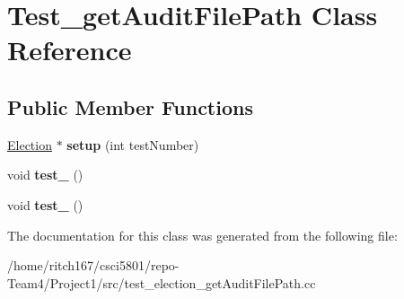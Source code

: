\hypertarget{classTest__getAuditFilePath}{}\section{Test\+\_\+get\+Audit\+File\+Path Class Reference}
\label{classTest__getAuditFilePath}
\subsection*{Public Member Functions}
\begin{DoxyCompactItemize}
\item 
\mbox{\label{classTest__getAuditFilePath_a8fe2ced1b2dd108a96d0f6ccbb832fb8}} 
\hyperlink{classElection}{Election} $\ast$ {\bfseries setup} (int test\+Number)
\item 
\mbox{\label{classTest__getAuditFilePath_a67077cd150b784740e92607b1fa95a14}} 
void {\bfseries test\+\_} ()
\item 
\mbox{\label{classTest__getAuditFilePath_a0f4ce4ec905e7a9aae0e14a0513dbd54}} 
void {\bfseries test\+\_} ()
\end{DoxyCompactItemize}


The documentation for this class was generated from the following file\+:\begin{DoxyCompactItemize}
\item 
/home/ritch167/csci5801/repo-\/\+Team4/\+Project1/src/test\+\_\+election\+\_\+get\+Audit\+File\+Path.\+cc\end{DoxyCompactItemize}
